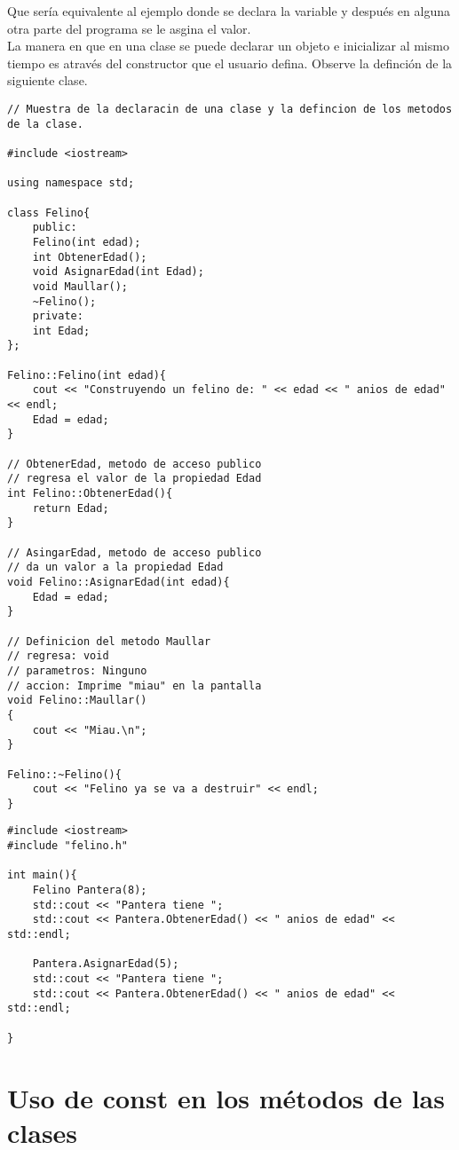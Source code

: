 \documentclass[12pt]{extarticle}
\newcommand{\<}{\langle}
\renewcommand{\>}{\rangle}
\theoremstyle{definition}
\begin{document}
Que sería equivalente al ejemplo donde se declara la variable y después en alguna otra parte del programa se le asgina el valor.\\ 

La manera en que en una clase se puede declarar un objeto e inicializar al mismo tiempo es através del constructor que el usuario defina. Observe la definción de la siguiente clase.

\begin{lstlisting}[caption={Uso de constructor y destructor definido por el usuario},captionpos=b]
// Muestra de la declaracin de una clase y la defincion de los metodos de la clase.

#include <iostream> 

using namespace std;

class Felino{
	public:
	Felino(int edad);
	int ObtenerEdad();
	void AsignarEdad(int Edad);
	void Maullar();
	~Felino();
	private:
	int Edad;
};

Felino::Felino(int edad){
	cout << "Construyendo un felino de: " << edad << " anios de edad" << endl; 
	Edad = edad;
}

// ObtenerEdad, metodo de acceso publico
// regresa el valor de la propiedad Edad
int Felino::ObtenerEdad(){
	return Edad;
}

// AsingarEdad, metodo de acceso publico
// da un valor a la propiedad Edad
void Felino::AsignarEdad(int edad){
	Edad = edad;
}

// Definicion del metodo Maullar
// regresa: void
// parametros: Ninguno
// accion: Imprime "miau" en la pantalla
void Felino::Maullar()
{
	cout << "Miau.\n";
}

Felino::~Felino(){
	cout << "Felino ya se va a destruir" << endl; 
}
\end{lstlisting}


\begin{lstlisting}[caption={Declaración e inicialización de un objeto utilizando el constructor definido por el usuario},captionpos=b]
#include <iostream>
#include "felino.h"

int main(){
	Felino Pantera(8);
	std::cout << "Pantera tiene ";
	std::cout << Pantera.ObtenerEdad() << " anios de edad" << std::endl; 
	
	Pantera.AsignarEdad(5);
	std::cout << "Pantera tiene ";
	std::cout << Pantera.ObtenerEdad() << " anios de edad" << std::endl; 
	
}
\end{lstlisting}

\section{Uso de const en los métodos de las clases}
\end{document}
